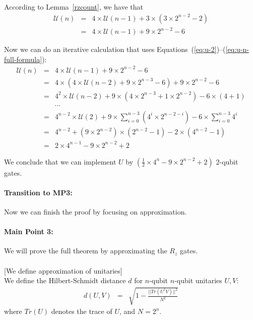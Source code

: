 \documentclass[11pt]{article}
\def\({\begin{eqnarray*}}
\def\){\end{eqnarray*}}
\begin{document}
According to Lemma~\ref{rzcount}, we have that 
\begin{eqnarray}
\mathcal{U}(n) & = & 4 \times \mathcal{U}(n-1) + 3 \times (3 \times 2^{n-2} - 2)
\nonumber \\
& = & 4 \times \mathcal{U}(n-1) + 9 \times 2^{n-2} - 6
\label{eq:u-n-full-formula}
\end{eqnarray}

Now we can do an iterative calculation that uses
Equations~(\ref{eq:u-2})--(\ref{eq:u-n-full-formula}):
\begin{eqnarray}
\mathcal{U}(n) & = & 4 \times \mathcal{U}(n-1) + 9 \times 2^{n-2} - 6 \nonumber \\
& = & 4 \times (4 \times \mathcal{U}(n-2) + 9 \times 2^{n-3} - 6) + 9 \times 2^{n-2} - 6 \nonumber \\
& = & 4^2 \times \mathcal{U}(n-2) + 9 \times (4 \times 2^{n-3} + 1 \times 2^{n-2}) - 6 \times (4 + 1) \nonumber \\
&& \cdots \nonumber \\
& = &  4^{n-2} \times \mathcal{U}(2) + 9 \times \sum^{n-3}_{i=0}(4^i \times 2^{n-2-i}) - 6 \times \sum^{n-3}_{i=0} 4^i  \nonumber \\
& = &  4^{n-2}  + (9 \times 2^{n-2}) \times (2^{n-2} - 1) - 2 \times (4^{n-2} - 1) \nonumber \\
& = &  2 \times 4^{n-1} - 9 \times 2^{n-2} + 2 
\nonumber
\end{eqnarray}

We conclude that we can implement $U$ by 
$(\frac{1}{2} \times 4^n - 9 \times 2^{n-2} + 2 )$ 2-qubit gates. 


\paragraph{Transition to MP3:}
Now we can finish the proof by focusing on approximation.

\paragraph{Main Point 3:}
We will prove the full theorem by approximating the $R_z$ gates. \\
\mbox{} \\ \hspace*{1cm}
   [We define approximation of unitaries] \\
We define the Hilbert-Schmidt distance $d$ for 
$n$-qubit $n$-qubit unitaries $U, V$:
\(
d(U,V) &=& 
\sqrt{ 1 - \frac{ || Tr( U^\dagger V ) ||^2 }{ N^2 } }
\)
where $Tr(U)$ denotes the trace of $U$, and $N = 2^n$.
\end{document}
